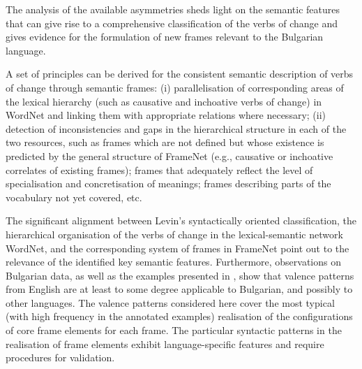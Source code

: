 \documentclass[output=paper,colorlinks,citecolor=brown]{langscibook}
\begin{document}

The analysis of the available asymmetries sheds light on the semantic features that can give rise to a comprehensive classification of the verbs of change and gives evidence for the formulation of new frames relevant to the Bulgarian language.


A set of principles can be derived for the consistent semantic description of verbs of change through semantic frames: (i) parallelisation of corresponding areas of the lexical hierarchy (such as causative and inchoative verbs of change) in WordNet and linking them with appropriate relations where necessary; (ii) detection of inconsistencies and gaps in the hierarchical structure in each of the two resources, such as frames which are not defined but whose existence is predicted by the general structure of FrameNet (e.g., causative or inchoative correlates of existing frames); frames that adequately reflect the level of specialisation and concretisation of meanings; frames describing parts of the vocabulary not yet covered, etc.

The significant alignment between Levin's syntactically oriented classification, the hierarchical organisation of the verbs of change in the lexical-semantic network WordNet, and the corresponding system of frames in FrameNet point out to the relevance of the identified key semantic features.
Furthermore, observations on Bulgarian data, as well as the examples presented in , show that valence patterns from English are at least to some degree applicable to Bulgarian, and possibly to other languages. The valence patterns considered here cover the most typical (with high frequency in the annotated examples) realisation of the configurations of core frame elements for each frame.  The particular syntactic patterns in the realisation of frame elements exhibit language-specific features and require procedures for validation.
\end{document}
